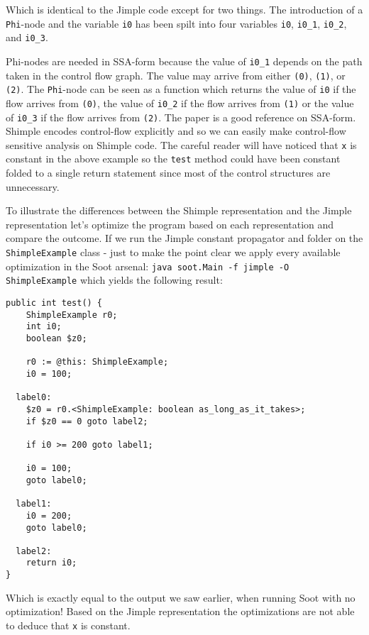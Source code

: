\documentclass{article}
\newcommand{\code}[1]{\texttt{\small #1}}
\begin{document}
Which is identical to the Jimple code except for two things. The
introduction of a \code{Phi}-node and the variable \code{i0} has been
spilt into four variables \code{i0}, \code{i0\_1}, \code{i0\_2}, and
\code{i0\_3}.

Phi-nodes are needed in SSA-form because the value of \code{i0\_1}
depends on the path taken in the control flow graph. The value may
arrive from either \code{(0)}, \code{(1)}, or \code{(2)}. The
\code{Phi}-node can be seen as a function which returns the value of
\code{i0} if the flow arrives from \code{(0)}, the value of
\code{i0\_2} if the flow arrives from \code{(1)} or the value of
\code{i0\_3} if the flow arrives from \code{(2)}. The paper
\cite{bilardi99static} is a good reference on SSA-form.\\

Shimple encodes control-flow explicitly and so we can easily make
control-flow sensitive analysis on Shimple code. The careful reader
will have noticed that \code{x} is constant in the above example so
the \code{test} method could have been constant folded to a single
return statement since most of the control structures are unnecessary. 

To illustrate the differences between the Shimple representation and
the Jimple representation let's optimize the program based on each
representation and compare the outcome. If we run the Jimple constant
propagator and folder on the \code{ShimpleExample} class - just to
make the point clear we apply every available optimization in the Soot
arsenal: \code{java soot.Main -f jimple -O ShimpleExample} which
yields the following result:

\begin{verbatim}
public int test() {
    ShimpleExample r0;
    int i0;
    boolean $z0;

    r0 := @this: ShimpleExample;
    i0 = 100;

  label0:
    $z0 = r0.<ShimpleExample: boolean as_long_as_it_takes>;
    if $z0 == 0 goto label2;

    if i0 >= 200 goto label1;

    i0 = 100;
    goto label0;

  label1:
    i0 = 200;
    goto label0;

  label2:
    return i0;
}
\end{verbatim}

Which is exactly equal to the output we saw earlier, when running Soot
with no optimization! Based on the Jimple representation the
optimizations are not able to deduce that \code{x} is constant.
\end{document}
